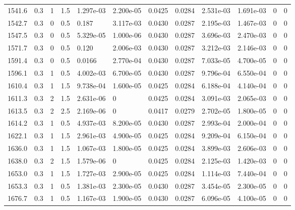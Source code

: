 \documentclass[preview]{standalone}
\begin{document}
{{{\begin{tabular}{L{1.2cm}C{1.2cm} C{0.3cm}C{0.5cm} C{1.4cm}C{1.4cm} C{1.4cm}C{1.4cm} C{1.6cm}C{1.6cm} C{1.6cm}C{1.6cm}}
  1541.6  &   0.3  & 1     & 1.5 &  1.297e-03  & 2.200e-05  &  0.0425&   0.0284& 2.531e-03 & 1.691e-03   &  0 & 0  \\ 
  1542.7  &   0.3  & 0     & 0.5 &  0.187  & 3.117e-03  &  0.0430&   0.0287& 2.195e-03 & 1.467e-03   &  0 & 0  \\ 
  1547.5  &   0.3  & 0     & 0.5 &  5.329e-05  & 1.000e-06  &  0.0430&   0.0287& 3.696e-03 & 2.470e-03   &  0 & 0  \\ 
  1571.7  &   0.3  & 0     & 0.5 &  0.120  & 2.006e-03  &  0.0430&   0.0287& 3.212e-03 & 2.146e-03   &  0 & 0  \\ 
  1591.4  &   0.3  & 0     & 0.5 &  0.0166  & 2.770e-04  &  0.0430&   0.0287& 7.033e-05 & 4.700e-05   &  0 & 0  \\ 
  1596.1  &   0.3  & 1     & 0.5 &  4.002e-03  & 6.700e-05  &  0.0430&   0.0287& 9.796e-04 & 6.550e-04   &  0 & 0  \\ 
  1610.4  &   0.3  & 1     & 1.5 &  9.738e-04  & 1.600e-05  &  0.0425&   0.0284& 6.188e-04 & 4.140e-04   &  0 & 0  \\ 
  1611.3  &   0.3  & 2     & 1.5 &  2.631e-06  & 0  &  0.0425&   0.0284& 3.091e-03 & 2.065e-03   &  0 & 0  \\ 
  1613.5  &   0.3  & 2     & 2.5 &  2.169e-06  & 0  &  0.0417&   0.0279& 2.702e-05 & 1.800e-05   &  0 & 0  \\ 
  1614.2  &   0.3  & 1     & 0.5 &  4.937e-03  & 8.200e-05  &  0.0430&   0.0287& 2.993e-04 & 2.000e-04   &  0 & 0  \\ 
  1622.1  &   0.3  & 1     & 1.5 &  2.961e-03  & 4.900e-05  &  0.0425&   0.0284& 9.209e-04 & 6.150e-04   &  0 & 0  \\ 
  1636.0  &   0.3  & 1     & 1.5 &  1.067e-03  & 1.800e-05  &  0.0425&   0.0284& 3.899e-03 & 2.606e-03   &  0 & 0  \\ 
  1638.0  &   0.3  & 2     & 1.5 &  1.579e-06  & 0  &  0.0425&   0.0284& 2.125e-03 & 1.420e-03   &  0 & 0  \\ 
  1653.0  &   0.3  & 1     & 1.5 &  1.727e-03  & 2.900e-05  &  0.0425&   0.0284& 1.114e-03 & 7.440e-04   &  0 & 0  \\ 
  1653.3  &   0.3  & 1     & 0.5 &  1.381e-03  & 2.300e-05  &  0.0430&   0.0287& 3.454e-05 & 2.300e-05   &  0 & 0  \\ 
  1676.7  &   0.3  & 1     & 0.5 &  1.167e-03  & 1.900e-05  &  0.0430&   0.0287& 6.096e-05 & 4.100e-05   &  0 & 0  \\ 
\hline 
\end{tabular} 

}}}
\end{document}
